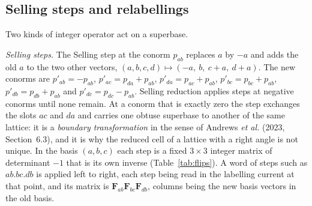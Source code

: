 \subsection{Selling steps and relabellings}
\label{sec:operators}
Two kinds of integer operator act on a superbase.

\emph{Selling steps.} The Selling step at the conorm $p_{ab}$ replaces $a$ by $-a$ and adds the old $a$ to the two other vectors, $(a,b,c,d)\mapsto(-a,\ b,\ c+a,\ d+a)$. The new conorms are $p'_{ab}=-p_{ab}$, $p'_{ac}=p_{da}+p_{ab}$, $p'_{da}=p_{ac}+p_{ab}$, $p'_{bc}=p_{bc}+p_{ab}$, $p'_{db}=p_{db}+p_{ab}$ and $p'_{dc}=p_{dc}-p_{ab}$. Selling reduction applies steps at negative conorms until none remain. At a conorm that is exactly zero the step exchanges the slots $ac$ and $da$ and carries one obtuse superbase to another of the same lattice: it is a \emph{boundary transformation} in the sense of Andrews \emph{et al.} (2023, Section~6.3), and it is why the reduced cell of a lattice with a right angle is not unique. In the basis $(a,b,c)$ each step is a fixed $3\times3$ integer matrix of determinant $-1$ that is its own inverse (Table~\ref{tab:flips}). A word of steps such as $ab.bc.db$ is applied left to right, each step being read in the labelling current at that point, and its matrix is $\mathbf F_{ab}\mathbf F_{bc}\mathbf F_{db}$, columns being the new basis vectors in the old basis.

